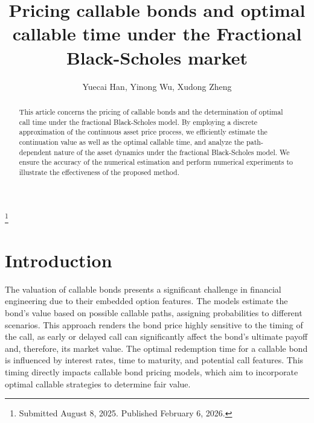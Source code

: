 \documentclass[reqno]{amsart}
\begin{document}
\title[\hfilneg EJDE-2026/09\hfil Pricing callable bonds]
{Pricing callable bonds and optimal callable time under the Fractional Black-Scholes market}


\author[Y. Han, Y. Wu, X. Zheng \hfil EJDE-2026/09\hfilneg]
{Yuecai Han, Yinong Wu, Xudong Zheng}

\address{Yuecai Han \newline
School of Mathematics,
Jilin University,
Changchun,  130012, Jilin, China}

\address{Yinong Wu \newline
School of Mathematics,
Jilin University, 
Changchun, 130012,  Jilin, China}

\address{Xudong Zheng \newline
School of Mathematics,
Jilin University,
Changchun, 130012,  Jilin, China}

\thanks{Submitted August 8, 2025. Published February 6, 2026.}

\begin{abstract}
This article concerns the pricing of callable bonds and the determination of optimal
call time under the fractional Black-Scholes model. By employing a discrete
approximation of the continuous asset price process, we efficiently estimate the
continuation value as well as the optimal callable time, and analyze the path-dependent
nature of the asset dynamics under the fractional Black-Scholes model.
We ensure the accuracy of the numerical estimation and perform numerical experiments
to illustrate the effectiveness of the proposed method.
\end{abstract}

\maketitle
{}
\newtheorem{theorem}{Theorem}[section]
\newtheorem{lemma}[theorem]{Lemma}
\newtheorem{remark}[theorem]{Remark}
\allowdisplaybreaks

\section{Introduction}

The valuation of callable bonds presents a significant challenge in financial 
engineering due to their embedded option features. The models estimate the bond's 
value based on possible callable paths, assigning probabilities to different scenarios. 
This approach renders the bond price highly sensitive to the timing of the call, 
as early or delayed call can significantly affect the bond's ultimate payoff and, 
therefore, its market value.
The optimal redemption time for a callable bond is influenced by interest rates, 
time to maturity, and potential call features. This timing directly impacts callable 
bond pricing models, which aim to incorporate optimal callable strategies to determine 
fair value.
\end{document}
